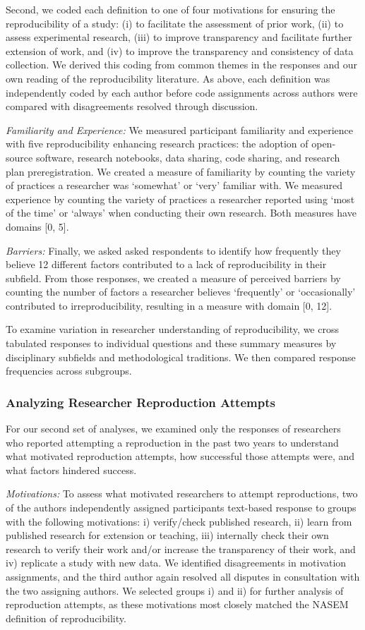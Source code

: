 \documentclass[]{interact}
\theoremstyle{plain}%
\theoremstyle{definition}
\theoremstyle{remark}
\begin{document}
Second, we coded each definition to one of four motivations for ensuring the reproducibility of a study: (i) to facilitate the assessment of prior work, (ii) to assess experimental research, (iii) to improve transparency and facilitate further extension of work, and (iv) to improve the transparency and consistency of data collection.
We derived this coding from common themes in the responses and our own reading of the reproducibility literature.
As above, each definition was independently coded by each author before code assignments across authors were compared with disagreements resolved through discussion.

\textit{Familiarity and Experience:} We measured participant familiarity and experience with five reproducibility enhancing research practices: the adoption of open-source software, research notebooks, data sharing, code sharing, and research plan preregistration. 
We created a measure of familiarity by counting the variety of practices a researcher was `somewhat' or `very' familiar with.
We measured experience by counting the variety of practices a researcher reported using `most of the time' or `always' when conducting their own research. 
Both measures have domains [0, 5]. 

\textit{Barriers:} Finally, we asked asked respondents to identify how frequently they believe 12 different factors contributed to a lack of reproducibility in their subfield. 
From those responses, we created a measure of perceived barriers by counting the number of factors a researcher believes `frequently' or `occasionally' contributed to irreproducibility, resulting in a measure with domain [0, 12].

To examine variation in researcher understanding of reproducibility, we cross tabulated responses to individual questions and these summary measures by disciplinary subfields and methodological traditions. 
We then compared response frequencies across subgroups.

\subsubsection*{Analyzing Researcher Reproduction Attempts}
\noindent For our second set of analyses, we examined only the responses of researchers who reported attempting a reproduction in the past two years to understand what motivated reproduction attempts, how successful those attempts were, and what factors hindered success.

\textit{Motivations:} To assess what motivated researchers to attempt reproductions, two of the authors independently assigned participants text-based response to groups with the following motivations: i) verify/check published research, ii) learn from published research for extension or teaching, iii) internally check their own research to verify their work and/or increase the transparency of their work, and iv) replicate a study with new data.
We identified disagreements in motivation assignments, and the third author again resolved all disputes in consultation with the two assigning authors.
We selected groups i) and ii) for further analysis of reproduction attempts, as these motivations most closely matched the NASEM definition of reproducibility. 
\end{document}
